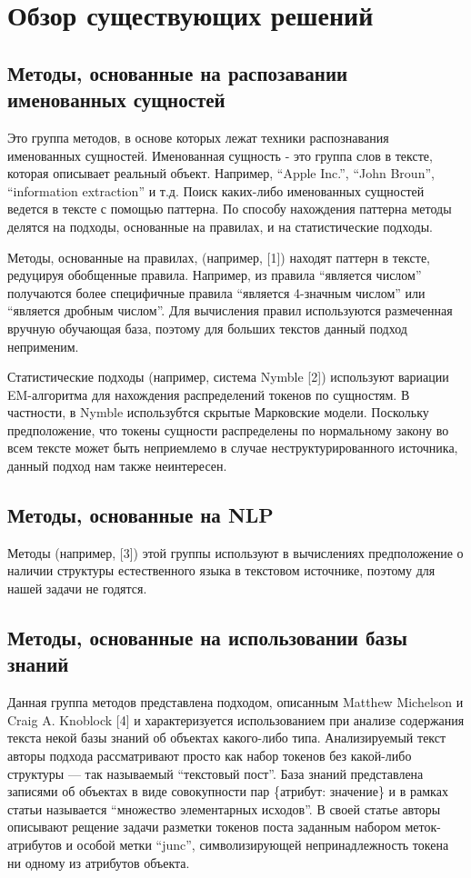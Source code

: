\chapter{Обзор существующих решений}


\section{Методы, основанные на распозавании именованных сущностей}

Это группа методов, в основе которых лежат техники распознавания именованных сущностей. Именованная сущность - это группа слов в тексте, которая описывает реальный объект. Например, ``Apple Inc.'', ``John Broun'', ``information extraction'' и т.д. Поиск каких-либо именованных сущностей ведется в тексте с помощью паттерна. По способу нахождения паттерна методы делятся на подходы, основанные на правилах, и на статистические подходы.

Методы, основанные на правилах, (например, [1]) находят паттерн в тексте, редуцируя обобщенные правила. Например, из правила ``является числом'' получаются более специфичные правила ``является 4-значным числом'' или ``является дробным числом''. Для вычисления правил используются размеченная вручную обучающая база, поэтому для больших текстов данный подход неприменим.

Статистические подходы (например, система Nymble [2]) используют вариации EM-алгоритма для нахождения распределений токенов по сущностям. В частности, в Nymble использубтся скрытые Марковские модели. Поскольку предположение, что токены сущности распределены по нормальному закону во всем тексте может быть неприемлемо в случае неструктурированного источника, данный подход нам также неинтересен.

\section{Методы, основанные на NLP}

Методы (например, [3]) этой группы используют в вычислениях предположение о наличии структуры естественного языка в текстовом источнике, поэтому для нашей задачи не годятся.


\section{Методы, основанные на использовании базы знаний}

Данная группа методов представлена подходом, описанным Matthew Michelson и Craig A. Knoblock [4] и характеризуется использованием при анализе содержания текста некой базы знаний об объектах какого-либо типа. Анализируемый текст авторы подхода рассматривают просто как набор токенов без какой-либо структуры --- так называемый ``текстовый пост''. База знаний представлена записями об объектах в виде совокупности пар \{атрибут: значение\} и в рамках статьи называется ``множество элементарных исходов''. В своей статье авторы описывают рещение задачи разметки токенов поста заданным набором меток-атрибутов и особой метки ``junc'', символизирующей непринадлежность токена ни одному из атрибутов объекта.

